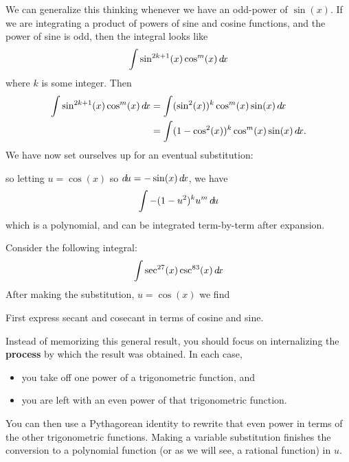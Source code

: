 \documentclass{ximera}
\begin{document}
We can generalize this thinking whenever we have an odd-power of $\sin(x)$.
If we are integrating a product of powers of sine and cosine
functions, and the power of sine is odd, then the integral looks like
\[
\int \sin^{2k+1}(x) \cos^m(x) \mathop{}\!d\! x
\]
where $k$ is some integer.  Then
\begin{align*}
  \int \sin^{2k+1}(x) \cos^m(x) \mathop{}\!d\! x &=\int(\sin^{2}(x))^k \cos^m(x) \sin(x) \mathop{}\!d\! x\\
  &= \int (1-\cos^2(x))^k \cos^m(x) \sin(x)\mathop{}\!d\! x.
\end{align*}
We have now set ourselves up for an eventual substitution:
\begin{center}%
\end{center}
so letting $u = \cos(x)$ so $\mathop{}\!d\! u =-\sin(x) \mathop{}\!d\! x$, we have
\[
\int -(1-u^2)^k u^m \mathop{}\!d\! u
\]
which is a polynomial, and can be integrated term-by-term after
expansion.


\begin{question}
  Consider the following integral:
  \[
  \int \sec^{27}(x)\csc^{83}(x) \mathop{}\!d\! x
  \]
  After making the substitution, $u = \cos(x)$ we find
  \begin{hint}
    First express secant and cosecant in terms of cosine and sine.
  \end{hint}\begin{multipleChoice}
  \end{multipleChoice}
\end{question}








\begin{warning}
Instead of memorizing this general result, you should focus on
internalizing the \textbf{process} by which the result was obtained.
In each case,
\begin{itemize}
\item you take off one power of a trigonometric function, and
\item you are left with an even power of that trigonometric
  function.
\end{itemize}
You can then use a Pythagorean identity to rewrite that even power in
terms of the other trigonometric functions.  Making a variable
substitution finishes the conversion to a polynomial function (or as
we will see, a rational function) in $u$.
\end{warning}
\end{document}
